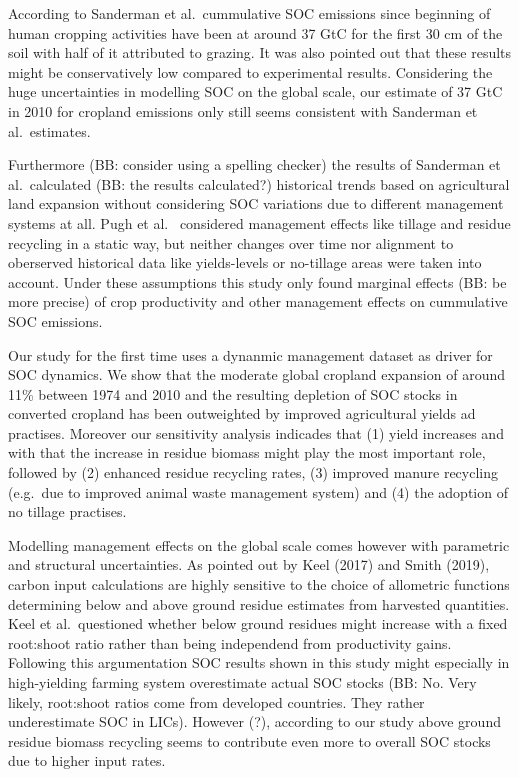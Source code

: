 \documentclass[gc, manuscript]{copernicus}
\begin{document}
According to Sanderman et al.~cummulative SOC emissions since beginning
of human cropping activities have been at around 37 GtC for the first 30
cm of the soil with half of it attributed to grazing. It was also
pointed out that these results might be conservatively low
compared to experimental results. Considering the huge uncertainties in modelling SOC on the global scale, 
our estimate of 37 GtC in 2010 for cropland emissions only still seems consistent with Sanderman et al.~estimates.

Furthermore (BB: consider using a spelling checker) the results of Sanderman et al.~calculated (BB: the results calculated?) historical trends
based on agricultural land expansion without considering SOC variations
due to different management systems at all. Pugh et al.~ considered management
effects like tillage and residue recycling in a static way, but
neither changes over time nor alignment to oberserved historical data
like yields-levels or no-tillage areas were taken into account. Under
these assumptions this study only found marginal effects (BB: be more precise) of crop
productivity and other management effects on cummulative SOC emissions.

Our study for the first time uses a dynanmic management dataset as driver for SOC dynamics. We
show that the moderate global cropland expansion of around 11\% between 1974 and
2010 and the resulting depletion of SOC stocks in converted cropland has been outweighted by improved agricultural yields ad practises.
Moreover our sensitivity analysis indicades that (1) yield increases and
with that the increase in residue biomass might play the most important
role, followed by (2) enhanced residue recycling rates, (3) improved
manure recycling (e.g.~due to improved animal waste management system)
and (4) the adoption of no tillage practises.

Modelling management effects on the global scale comes however with 
parametric and structural uncertainties. As pointed out by Keel
(2017) and Smith (2019), carbon input
calculations are highly sensitive to the choice of allometric functions
determining below and above ground residue estimates from harvested
quantities. Keel et al.~questioned whether below ground residues might
increase with a fixed root:shoot ratio rather than being independend from
productivity gains. Following this argumentation SOC results shown in
this study might especially in high-yielding farming system overestimate
actual SOC stocks (BB: No. Very likely, root:shoot ratios come from developed countries. They rather underestimate SOC in LICs). However (?), according to our study above ground residue biomass recycling seems to contribute even more to overall SOC stocks due
to higher input rates.
\end{document}
